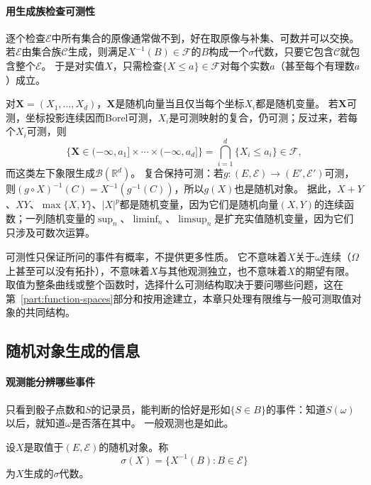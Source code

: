 \paragraph{用生成族检查可测性}
逐个检查$\mathcal E$中所有集合的原像通常做不到，好在取原像与补集、可数并可以交换。
若$\mathcal E$由集合族$\mathcal C$生成，则满足$X^{-1}(B)\in\mathcal F$的$B$构成一个$\sigma$代数，只要它包含$\mathcal C$就包含整个$\mathcal E$。
于是对实值$X$，只需检查$\{X\le a\}\in\mathcal F$对每个实数$a$（甚至每个有理数$a$）成立。

对$\bm X=(X_1,\dots,X_d)$，$\bm X$是随机向量当且仅当每个坐标$X_i$都是随机变量。
若$\bm X$可测，坐标投影连续因而Borel可测，$X_i$是可测映射的复合，仍可测；反过来，若每个$X_i$可测，则
\[
  \{\bm X\in(-\infty,a_1]\times\cdots\times(-\infty,a_d]\}=\bigcap_{i=1}^d\{X_i\le a_i\}\in\mathcal F,
\]
而这类左下象限生成$\mathcal B(\mathbb R^d)$。
复合保持可测：若$g:(E,\mathcal E)\to(E',\mathcal E')$可测，则$(g\circ X)^{-1}(C)=X^{-1}(g^{-1}(C))$，所以$g(X)$也是随机对象。
据此，$X+Y$、$XY$、$\max\{X,Y\}$、$|X|^p$都是随机变量，因为它们是随机向量$(X,Y)$的连续函数；一列随机变量的$\sup_n$、$\liminf_n$、$\limsup_n$是扩充实值随机变量，因为它们只涉及可数次运算。

可测性只保证所问的事件有概率，不提供更多性质。
它不意味着$X$关于$\omega$连续（$\Omega$上甚至可以没有拓扑），不意味着$X$与其他观测独立，也不意味着$X$的期望有限。
取值为整条曲线或整个函数时，选择什么可测结构取决于要问哪些问题，这在第~\ref{part:function-spaces}部分和按用途建立，本章只处理有限维与一般可测取值对象的共同结构。

\subsection{随机对象生成的信息}

\paragraph{观测能分辨哪些事件}
只看到骰子点数和$S$的记录员，能判断的恰好是形如$\{S\in B\}$的事件：知道$S(\omega)$以后，就知道$\omega$是否落在其中。
一般观测也是如此。

\begin{definition}
\label{def:pmod-generated-sigma}
设$X$是取值于$(E,\mathcal E)$的随机对象。称
\[
  \sigma(X)=\{X^{-1}(B):B\in\mathcal E\}
\]
为$X$生成的$\sigma$代数。
\end{definition}

